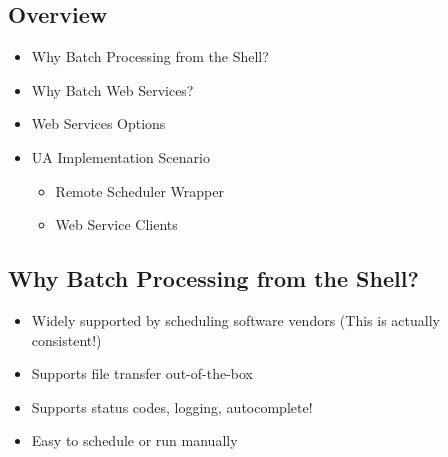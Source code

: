 \documentclass[12pt,notitlepage]{article}
\author{Leo Przybylski}
\begin{document}
  \W \begin{s5presentation}
  \maketitle

%
%
  \W \begin{s5slide}
    \section{Overview }
    \begin{itemize}
      \item Why Batch Processing from the Shell?
      \item Why Batch Web Services?
      \item Web Services Options
      \item UA Implementation Scenario
        \begin{itemize}
          \item Remote Scheduler Wrapper
          \item Web Service Clients
        \end{itemize}
    \end{itemize}
    
  \W \end{s5slide}

%
%
  \W \begin{s5slide}
    \section{Why Batch Processing from the Shell? }
    \begin{itemize}
      \item Widely supported by scheduling software vendors (This is actually consistent!)
      \item Supports file transfer out-of-the-box
      \item Supports status codes, logging, autocomplete!
      \item Easy to schedule or run manually
    \end{itemize}
    
  \W \end{s5slide}


\end{s5presentation}
\end{document}
